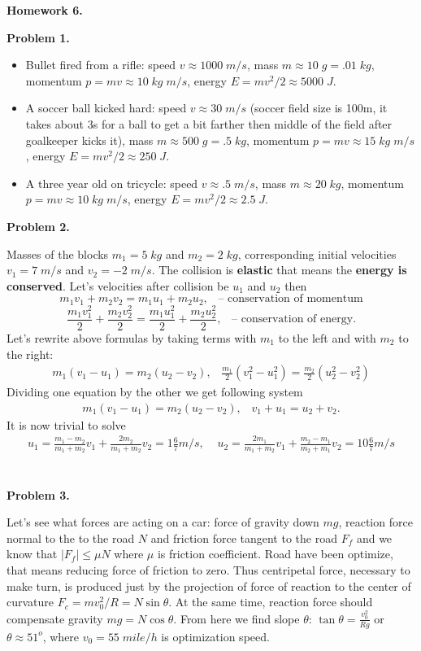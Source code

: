 \documentclass[12pt]{article}
\def\be{\begin{eqnarray}}
\def\ee{\end{eqnarray}}
\begin{document}
\begin{center}
{\bf\large Homework 6.}
\end{center}

{\bf Problem 1.}
\begin{itemize}
\item {} Bullet fired from a rifle: speed $v\approx 1000\;m/s$,  mass $m\approx 10 \;g=.01\;kg$, momentum $p=mv\approx 10\;kg\;m/s$, energy $E=mv^2/2\approx 5000\;J$.
\item {} A soccer ball kicked hard: speed $v\approx 30\;m/s$ (soccer field size is 100m, it takes
about 3s for a ball to get a bit farther then middle of the field after goalkeeper kicks it),  mass $m\approx 500 \;g=.5\;kg$, momentum $p=mv\approx 15\;kg\;m/s$, energy $E=mv^2/2\approx 250\;J$.
\item {} A three year old on tricycle: speed $v\approx .5\;m/s$,  mass $m\approx 20\;kg$, momentum $p=mv\approx 10\;kg\;m/s$, energy $E=mv^2/2\approx 2.5\;J$.
\end{itemize}


{\bf Problem 2.}

Masses of the blocks $m_1=5\;kg$ and $m_2=2\;kg$, corresponding initial velocities
$v_1=7\;m/s$ and $v_2=-2\;m/s$. The collision is {\bf elastic} that means the {\bf energy is conserved}. Let's velocities after collision be $u_1$ and $u_2$ then
$$m_1 v_1 +m_2 v_2=m_1 u_1 +m_2 u_2,\;\;\;\mbox{-- conservation of momentum}$$
$$
\frac{m_1 v_1^2}{2} +\frac{m_2 v_2^2}{2}=\frac{m_1 u_1^2}{2} +\frac{m_2 u_2^2}{2},\;\;\;\mbox{-- conservation of energy.}$$
Let's rewrite above formulas by taking terms with $m_1$ to the left and with $m_2$ to the right:
\be
m_1( v_1 - u_1) =m_2( u_2-v_2),\;\;\; \frac{m_1}{2}(v_1^2-u_1^2) = \frac{m_2}{2}(u_2^2-v_2^2)\nonumber
\ee
Dividing one equation by the other we get following system
\be
m_1( v_1 - u_1) =m_2( u_2-v_2),\;\;\; v_1+u_1 = u_2+v_2.\nonumber
\ee
It is now trivial to solve
\be
u_1=\frac{m_1-m_2}{m_1+m_2}v_1 +\frac{2 m_2}{m_1+m_2}v_2=1\frac{6}{7}m/s,\;\;\;\;
u_2=\frac{2 m_1}{m_1+m_2}v_1 +\frac{ m_2-m_1}{m_2+m_1}v_2=10\frac{6}{7}m/s\nonumber
\ee
\\
\\

{\bf Problem 3.}

Let's see what forces are acting on a car: force of gravity down $mg$, reaction force normal to the  to the road $N$ and friction force tangent to the road $F_f$ and we know
that $|F_f|\le \mu N$ where $\mu$ is friction coefficient. Road have been optimize, that means reducing force of friction to zero. Thus centripetal force, necessary to make turn, is produced
just by the projection of force of reaction to the center of curvature $F_c=mv_0^2/R=N\sin\theta$. At the same time, reaction force should compensate gravity $mg=N\cos \theta$. From here 
we find slope $\theta$:  $\tan\theta = \frac{ v_0^2}{Rg}$ or $\theta\approx 51^o$, where $v_0=55\;mile/h$ is optimization speed.
\end{document}
